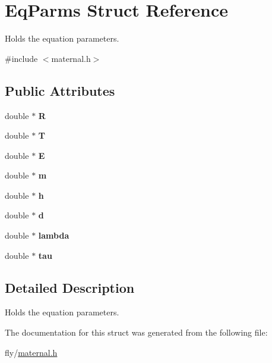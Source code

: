 \hypertarget{structEqParms}{
\section{EqParms Struct Reference}
\label{structEqParms}
}


Holds the equation parameters.  


{\ttfamily \#include $<$maternal.h$>$}\subsection*{Public Attributes}
\begin{DoxyCompactItemize}
\item 
\hypertarget{structEqParms_a668f056ab12ab6f71b1c883345476783}{
double $\ast$ {\bfseries R}}
\label{structEqParms_a668f056ab12ab6f71b1c883345476783}

\item 
\hypertarget{structEqParms_aa581455fde4a8127f02757d446c2854f}{
double $\ast$ {\bfseries T}}
\label{structEqParms_aa581455fde4a8127f02757d446c2854f}

\item 
\hypertarget{structEqParms_a690489c6193e5b1d0f8704731ee984f4}{
double $\ast$ {\bfseries E}}
\label{structEqParms_a690489c6193e5b1d0f8704731ee984f4}

\item 
\hypertarget{structEqParms_a01bf0c6ff6923d2ed6bad4b2443be275}{
double $\ast$ {\bfseries m}}
\label{structEqParms_a01bf0c6ff6923d2ed6bad4b2443be275}

\item 
\hypertarget{structEqParms_a7d5126ffda756c7795221c336e613b85}{
double $\ast$ {\bfseries h}}
\label{structEqParms_a7d5126ffda756c7795221c336e613b85}

\item 
\hypertarget{structEqParms_aa42b6ac60458f6599b824e7d1fb2a027}{
double $\ast$ {\bfseries d}}
\label{structEqParms_aa42b6ac60458f6599b824e7d1fb2a027}

\item 
\hypertarget{structEqParms_adf038eb2cc110b6f105922d19a4cd10d}{
double $\ast$ {\bfseries lambda}}
\label{structEqParms_adf038eb2cc110b6f105922d19a4cd10d}

\item 
\hypertarget{structEqParms_a54dcb437331c5a395258c20f259c4662}{
double $\ast$ {\bfseries tau}}
\label{structEqParms_a54dcb437331c5a395258c20f259c4662}

\end{DoxyCompactItemize}


\subsection{Detailed Description}
Holds the equation parameters. 

The documentation for this struct was generated from the following file:\begin{DoxyCompactItemize}
\item 
fly/\hyperlink{maternal_8h}{maternal.h}\end{DoxyCompactItemize}
